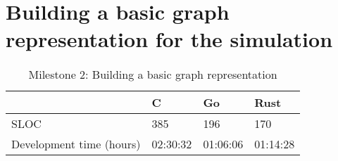 \section{Building a basic graph representation for the simulation}
\label{sec:Implementation::Graph_Representation}

\begin{table}[htb]
    \centering
    \begin{tabular}{llll}
        \toprule
            & C
            & Go
            & Rust \\
        \midrule

        SLOC
            & 385
            & 196
            & 170 \\

        Development time (hours)
            & 02:30:32
            & 01:06:06
            & 01:14:28 \\
        \bottomrule
    \end{tabular}
    \caption{Milestone 2: Building a basic graph representation}
    \label{tb:milestone2}
\end{table}

